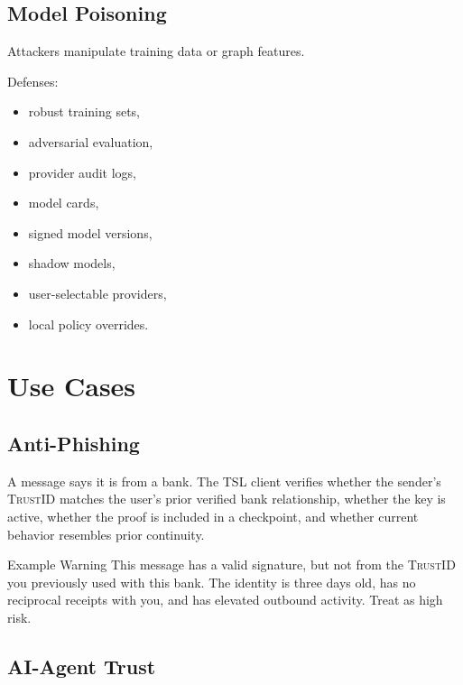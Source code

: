 \documentclass[11pt]{article}
\newcommand{\TSL}{\textsc{TSL}}
\newcommand{\TrustID}{\textsc{TrustID}}
\begin{document}
\subsection{Model Poisoning}

Attackers manipulate training data or graph features.

Defenses:

\begin{itemize}
    \item robust training sets,
    \item adversarial evaluation,
    \item provider audit logs,
    \item model cards,
    \item signed model versions,
    \item shadow models,
    \item user-selectable providers,
    \item local policy overrides.
\end{itemize}

\section{Use Cases}

\subsection{Anti-Phishing}

A message says it is from a bank. The \TSL{} client verifies whether the sender's \TrustID{} matches the user's prior verified bank relationship, whether the key is active, whether the proof is included in a checkpoint, and whether current behavior resembles prior continuity.

\begin{warningbox}{Example Warning}
This message has a valid signature, but not from the \TrustID{} you previously used with this bank. The identity is three days old, has no reciprocal receipts with you, and has elevated outbound activity. Treat as high risk.
\end{warningbox}

\subsection{AI-Agent Trust}
\end{document}
